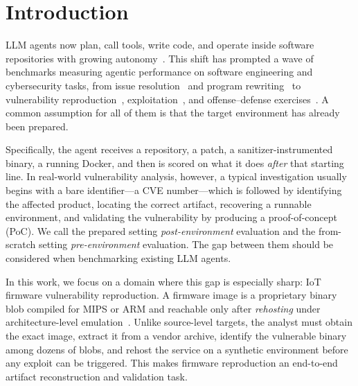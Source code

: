 \section{Introduction}

%
LLM agents now plan, call tools, write code, and operate inside software repositories with growing autonomy~\cite{swebench,programbench}. 
%
This shift has prompted a wave of benchmarks measuring agentic performance on software engineering and cybersecurity tasks, from issue resolution~\cite{swebench} and program rewriting~\cite{programbench} to vulnerability reproduction~\cite{cybergym,krepro}, exploitation~\cite{cvebench,exploitgym,exploitbench}, and offense--defense exercises~\cite{bountybench,secbench}. 
%
A common assumption for all of them is that the target environment has already been prepared. 

%
Specifically, the agent receives a repository, a patch, a sanitizer-instrumented binary, a running Docker, and then is scored on what it does \emph{after} that starting line. 
%
In real-world vulnerability analysis, however, a typical investigation usually begins with a bare identifier---a CVE number---which is followed by identifying the affected product, locating the correct artifact, recovering a runnable environment, and validating the vulnerability by producing a proof-of-concept (PoC). 
%
We call the prepared setting \emph{post-environment} evaluation and the from-scratch setting \emph{pre-environment} evaluation. 
%
The gap between them should be considered when benchmarking existing LLM agents.

In this work, we focus on a domain where this gap is especially sharp: IoT firmware vulnerability reproduction. 
%
A firmware image is a proprietary binary blob compiled for MIPS or ARM and reachable only after \textit{rehosting} under architecture-level emulation~\cite{challenges,firmadyne,firmae}.
%
Unlike source-level targets, the analyst must obtain the exact image, extract it from a vendor archive, identify the vulnerable binary among dozens of blobs, and rehost the service on a synthetic environment before any exploit can be triggered. 
%
This makes firmware reproduction an end-to-end artifact reconstruction and validation task.
%

